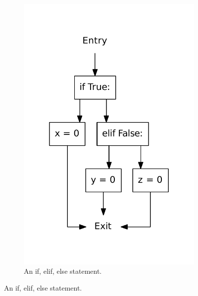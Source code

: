 \begin{figure}
\begin{subfigure}[b]{0.3\textwidth}
    \includegraphics[width=\textwidth]{./figures/if_else_elif.pdf}
    \caption{An if, elif, else statement.}
    \label{fig:if:if_elif_else}
  \end{subfigure}
  \label{fig:if}
\end{figure}

